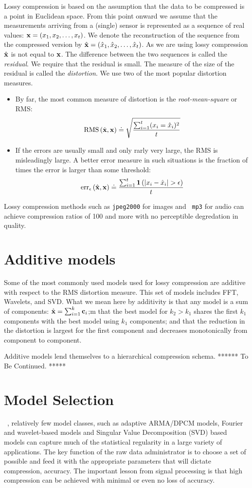 Lossy compression is based on the assumption that the data to be
compressed is a point in Euclidean space. From this point onward we
assume that the measurements arriving from a (single) sensor is
represented as a sequence of real values: $\mathbf{x}=(x_1,x_2,\ldots,x_t)$.
We denote the reconstruction of the sequence from the compressed
version by $\hat{\mathbf{x}}=(\hat{x}_1,\hat{x}_2,\ldots,\hat{x}_t)$. As we are using lossy
compression $\hat{\mathbf{x}}$ is not equal to $\mathbf{x}$. The difference between
the two sequences is called the {\em residual}. We require that the
residual is small. The measure of the size of the residual is called
the {\em distortion}. We use two of the most popular distortion
measures.
\begin{itemize}
\item By far, the most common measure of distortion is the {\em root-mean-square}
or RMS:
\[
\mbox{RMS}\left(\hat{\mathbf{x}},\mathbf{x} \right)
\doteq \sqrt{\frac{\sum_{i=1}^t (x_i =\hat{x}_i)^2}{t}}
\]
\item If the errors are usually small and only rarly very large,
the RMS is misleadingly large. A better error measure in such
situations is the fraction of times the error is larger
than some threshold:
\[
\mbox{err}_{\epsilon}\left(\vhx,\vx \right)
\doteq \frac{\sum_{i=1}^t \mathbf{1}\left(|x_i-\hx_i|>\epsilon \right)}{t}
\]
\end{itemize}
Lossy compression methods such as {\tt jpeg2000} for images and {\tt
  mp3} for audio can achieve compression ratios of 100 and more
with no perceptible degredation in quality.

\section{Additive models}
Some of the most commonly used models used for lossy compression are
additive with respect to the RMS distortion measure. This set of
models includes FFT, Wavelets, and SVD. What we mean here by
additivity is that any model is a sum of components: $\hat{\mathbf{x}} =
\sum_{i=1}^k \mathbf{c}_i$;m that the best model for $k_2>k_1$ shares the
first $k_1$ components with the best model using $k_1$ components; and
that the reduction in the distortion is largest for the first component
and decreases monotonically from component to component.

Additive models lend themselves to a hierarchical compression
schema. ****** To Be Continued. *****


\section{Model Selection}
\label{sec:Model Selection}
~\cite{Sayood12},
relatively few model classes, such as adaptive ARMA/DPCM models,
Fourier and wavelet-based models and Singular Value Decomposition
(SVD) based models can capture much of the statistical regularity in a
large variety of applications. The key
function of the raw data administrator is to choose a set of possible 
and feed it with the appropriate parameters that
will dictate compression, accuracy. The important lesson from signal
processing is that high compression can be achieved with minimal or
even no loss of accuracy.

